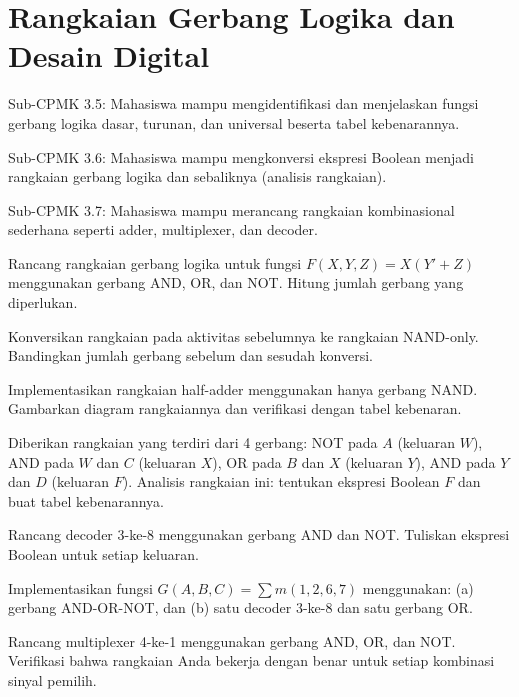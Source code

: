 \documentclass[../main]{subfiles}
\begin{document}
\chapter{Rangkaian Gerbang Logika dan Desain Digital}

\begin{subcpmk}
  \item Sub-CPMK 3.5: Mahasiswa mampu mengidentifikasi dan menjelaskan fungsi gerbang logika dasar, turunan, dan universal beserta tabel kebenarannya.
  \item Sub-CPMK 3.6: Mahasiswa mampu mengkonversi ekspresi Boolean menjadi rangkaian gerbang logika dan sebaliknya (analisis rangkaian).
  \item Sub-CPMK 3.7: Mahasiswa mampu merancang rangkaian kombinasional sederhana seperti adder, multiplexer, dan decoder.
\end{subcpmk}










\begin{aktivitas}
  \item Rancang rangkaian gerbang logika untuk fungsi $F(X,Y,Z) = X(Y' + Z)$ menggunakan gerbang AND, OR, dan NOT. Hitung jumlah gerbang yang diperlukan.
  \item Konversikan rangkaian pada aktivitas sebelumnya ke rangkaian NAND-only. Bandingkan jumlah gerbang sebelum dan sesudah konversi.
  \item Implementasikan rangkaian half-adder menggunakan hanya gerbang NAND. Gambarkan diagram rangkaiannya dan verifikasi dengan tabel kebenaran.
  \item Diberikan rangkaian yang terdiri dari 4 gerbang: NOT pada $A$ (keluaran $W$), AND pada $W$ dan $C$ (keluaran $X$), OR pada $B$ dan $X$ (keluaran $Y$), AND pada $Y$ dan $D$ (keluaran $F$). Analisis rangkaian ini: tentukan ekspresi Boolean $F$ dan buat tabel kebenarannya.
  \item Rancang decoder 3-ke-8 menggunakan gerbang AND dan NOT. Tuliskan ekspresi Boolean untuk setiap keluaran.
  \item Implementasikan fungsi $G(A,B,C) = \sum m(1, 2, 6, 7)$ menggunakan: (a) gerbang AND-OR-NOT, dan (b) satu decoder 3-ke-8 dan satu gerbang OR.
  \item Rancang multiplexer 4-ke-1 menggunakan gerbang AND, OR, dan NOT. Verifikasi bahwa rangkaian Anda bekerja dengan benar untuk setiap kombinasi sinyal pemilih.
\end{aktivitas}
\end{document}
